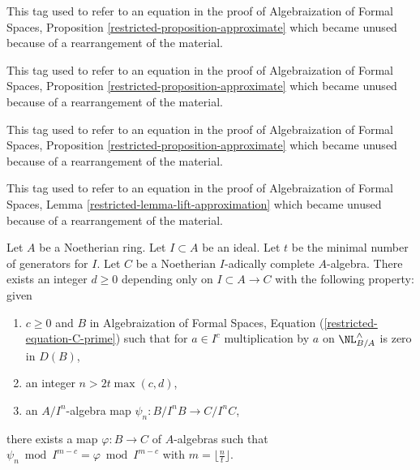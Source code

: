 \begin{remark}
\label{remark-equation-ci}
This tag used to refer to an equation in the proof of
Algebraization of Formal Spaces, Proposition
\ref{restricted-proposition-approximate}
which became unused because of a rearrangement of the material.
\end{remark}

\begin{remark}
\label{remark-equation-in-ideal}
This tag used to refer to an equation in the proof of
Algebraization of Formal Spaces, Proposition
\ref{restricted-proposition-approximate}
which became unused because of a rearrangement of the material.
\end{remark}

\begin{remark}
\label{remark-equation-derivatives-analogue}
This tag used to refer to an equation in the proof of
Algebraization of Formal Spaces, Proposition
\ref{restricted-proposition-approximate}
which became unused because of a rearrangement of the material.
\end{remark}

\begin{remark}
\label{remark-equation-go-down}
This tag used to refer to an equation in the proof of
Algebraization of Formal Spaces, Lemma
\ref{restricted-lemma-lift-approximation}
which became unused because of a rearrangement of the material.
\end{remark}

\begin{lemma}
\label{lemma-get-morphism-general}
Let $A$ be a Noetherian ring. Let $I \subset A$ be an ideal.
Let $t$ be the minimal number of generators for $I$.
Let $C$ be a Noetherian $I$-adically complete $A$-algebra.
There exists an integer $d \geq 0$ depending only on
$I \subset A \to C$ with the following property: given
\begin{enumerate}
\item $c \geq 0$ and $B$ in
Algebraization of Formal Spaces, Equation (\ref{restricted-equation-C-prime})
such that for $a \in I^c$
multiplication by $a$ on $\NL_{B/A}^\wedge$ is zero in $D(B)$,
\item an integer $n > 2t\max(c, d)$,
\item an $A/I^n$-algebra map $\psi_n : B/I^nB \to C/I^nC$,
\end{enumerate}
there exists a map $\varphi : B \to C$ of $A$-algebras such
that $\psi_n \bmod I^{m - c} = \varphi \bmod I^{m - c}$
with $m = \lfloor \frac{n}{t} \rfloor$.
\end{lemma}

